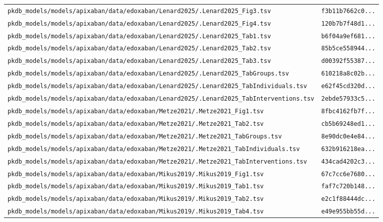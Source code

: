 \documentclass{article}
\begin{document}
\begin{longtable}{ll}
\texttt{pkdb\_models/models/apixaban/data/edoxaban/Lenard2025/.Lenard2025\_Fig3.tsv} & \texttt{f3b11b7662c0...} \\
\texttt{pkdb\_models/models/apixaban/data/edoxaban/Lenard2025/.Lenard2025\_Fig4.tsv} & \texttt{120b7b7f48d1...} \\
\texttt{pkdb\_models/models/apixaban/data/edoxaban/Lenard2025/.Lenard2025\_Tab1.tsv} & \texttt{b6f04a9ef681...} \\
\texttt{pkdb\_models/models/apixaban/data/edoxaban/Lenard2025/.Lenard2025\_Tab2.tsv} & \texttt{85b5ce558944...} \\
\texttt{pkdb\_models/models/apixaban/data/edoxaban/Lenard2025/.Lenard2025\_Tab3.tsv} & \texttt{d00392f55387...} \\
\texttt{pkdb\_models/models/apixaban/data/edoxaban/Lenard2025/.Lenard2025\_TabGroups.tsv} & \texttt{610218a8c02b...} \\
\texttt{pkdb\_models/models/apixaban/data/edoxaban/Lenard2025/.Lenard2025\_TabIndividuals.tsv} & \texttt{e62f45cd320d...} \\
\texttt{pkdb\_models/models/apixaban/data/edoxaban/Lenard2025/.Lenard2025\_TabInterventions.tsv} & \texttt{2ebde57933c5...} \\
\texttt{pkdb\_models/models/apixaban/data/edoxaban/Metze2021/.Metze2021\_Fig1.tsv} & \texttt{8fbc4162fb7f...} \\
\texttt{pkdb\_models/models/apixaban/data/edoxaban/Metze2021/.Metze2021\_Tab2.tsv} & \texttt{cb5b69248ed1...} \\
\texttt{pkdb\_models/models/apixaban/data/edoxaban/Metze2021/.Metze2021\_TabGroups.tsv} & \texttt{8e90dc0e4e84...} \\
\texttt{pkdb\_models/models/apixaban/data/edoxaban/Metze2021/.Metze2021\_TabIndividuals.tsv} & \texttt{632b916218ea...} \\
\texttt{pkdb\_models/models/apixaban/data/edoxaban/Metze2021/.Metze2021\_TabInterventions.tsv} & \texttt{434cad4202c3...} \\
\texttt{pkdb\_models/models/apixaban/data/edoxaban/Mikus2019/.Mikus2019\_Fig1.tsv} & \texttt{67c7cc6e7680...} \\
\texttt{pkdb\_models/models/apixaban/data/edoxaban/Mikus2019/.Mikus2019\_Tab1.tsv} & \texttt{faf7c720b148...} \\
\texttt{pkdb\_models/models/apixaban/data/edoxaban/Mikus2019/.Mikus2019\_Tab2.tsv} & \texttt{e2c1f88444dc...} \\
\texttt{pkdb\_models/models/apixaban/data/edoxaban/Mikus2019/.Mikus2019\_Tab4.tsv} & \texttt{e49e955bb55d...} \\

\end{longtable}
\end{document}
